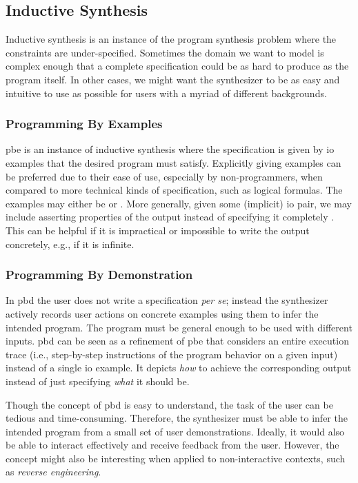 \subsection{Inductive Synthesis}
\label{sec:inductive}

Inductive synthesis is an instance of the program synthesis problem where the
constraints are under-specified. Sometimes the domain we want to model is
complex enough that a complete specification could be as hard to produce as the
program itself. In other cases, we might want the synthesizer to be as easy and
intuitive to use as possible for users with a myriad of different backgrounds.

\subsubsection{Programming By Examples}

\Gls{pbe} is an instance of inductive synthesis where the specification is given
by \gls{io} examples that the desired program must satisfy. Explicitly giving
examples can be preferred due to their ease of use, especially by
non-programmers, when compared to more technical kinds of specification, such as
logical formulas. The examples may either be  or . More generally, given some
(implicit) \gls{io} pair, we may include asserting properties of the output
instead of specifying it completely \cite{Gulwani2017, Polozov:2015:FFI}. This
can be helpful if it is impractical or impossible to write the output concretely,
e.g., if it is infinite.

\subsubsection{Programming By Demonstration}

In \gls{pbd} the user does not write a specification \textit{per se}; instead the
synthesizer actively records user actions on concrete examples using them to
infer the intended program. The program must be general enough to be used
with different inputs. \gls{pbd} can be seen as a refinement of \gls{pbe} that
considers an entire execution trace (i.e., step-by-step instructions of the
program behavior on a given input) instead of a single \gls{io} example. It
depicts \textit{how} to achieve the corresponding output instead of just
specifying \textit{what} it should be.

Though the concept of \gls{pbd} is easy to understand, the task of the user can
be tedious and time-consuming. Therefore, the synthesizer must be able to infer
the intended program from a small set of user demonstrations. Ideally, it would
also be able to interact effectively and receive feedback from the user.
However, the concept might also be interesting when applied to non-interactive
contexts, such as \textit{reverse engineering}.

